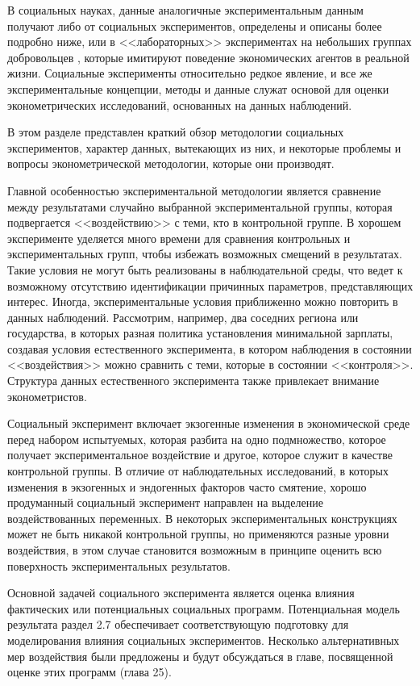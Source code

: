 В социальных науках, данные аналогичные экспериментальным данным получают либо от социальных экспериментов, определены и описаны более подробно ниже, или в  <<лабораторных>> экспериментах на небольших группах добровольцев , которые имитируют поведение экономических агентов в реальной жизни. Социальные эксперименты относительно редкое явление, и все же экспериментальные концепции, методы и данные служат основой для оценки эконометрических исследований, основанных на данных наблюдений.


В этом разделе представлен краткий обзор методологии социальных экспериментов, характер данных, вытекающих из них, и некоторые проблемы и вопросы эконометрической методологии, которые они производят.


Главной особенностью экспериментальной методологии является сравнение между результатами случайно выбранной экспериментальной группы, которая подвергается <<воздействию>> с теми, кто в контрольной группе. В хорошем эксперименте уделяется много времени для сравнения контрольных и экспериментальных групп, чтобы избежать возможных смещений в результатах. Такие условия не могут быть реализованы в наблюдательной среды, что ведет к возможному отсутствию идентификации причинных параметров, представляющих интерес. Иногда, экспериментальные условия приближенно можно повторить в данных наблюдений. Рассмотрим, например, два соседних региона или государства, в которых разная политика установления минимальной зарплаты, создавая условия естественного эксперимента, в котором наблюдения в состоянии <<воздействия>> можно сравнить с теми, которые в состоянии <<контроля>>. Структура данных естественного эксперимента также привлекает внимание эконометристов.


Социальный эксперимент включает экзогенные изменения в экономической среде перед набором испытуемых, которая разбита на одно подмножество, которое получает экспериментальное воздействие и другое, которое служит в качестве контрольной группы. В отличие от наблюдательных исследований, в которых изменения в экзогенных и эндогенных факторов часто смятение, хорошо продуманный социальный эксперимент направлен на выделение воздействованных переменных. В некоторых экспериментальных конструкциях может не быть никакой контрольной группы, но применяются разные уровни воздействия, в этом случае становится возможным в принципе оценить всю поверхность экспериментальных результатов.


Основной задачей социального эксперимента является оценка влияния фактических или потенциальных социальных программ. Потенциальная модель результата раздел 2.7 обеспечивает соответствующую подготовку для моделирования влияния социальных экспериментов. Несколько альтернативных мер воздействия были предложены и будут обсуждаться в главе, посвященной оценке этих программ (глава 25).


